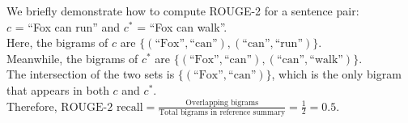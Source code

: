\begin{example}\label{ex:rouge}
    We briefly demonstrate how to compute ROUGE-2 for a sentence pair:\\
    $c$ = ``Fox can run'' and $c^{*}$ = ``Fox can walk''.\\
    Here, the bigrams of $c$ are $\{(\text{``Fox''}, \text{``can''}), (\text{``can''}, \text{``run''})\}$. \\
    Meanwhile, the bigrams of $c^{*}$ are $\{(\text{``Fox''}, \text{``can''}), (\text{``can''}, \text{``walk''})\}$.\\
    The intersection of the two sets is $\{(\text{``Fox''}, \text{``can''})\}$, which is the only bigram that appears in both $c$ and $c^{*}$.\\
    Therefore, $\text{ROUGE-2 recall} = \frac{\text{Overlapping bigrams}}{\text{Total bigrams in reference summary}} = \frac{1}{2}=0.5$.
\end{example}
